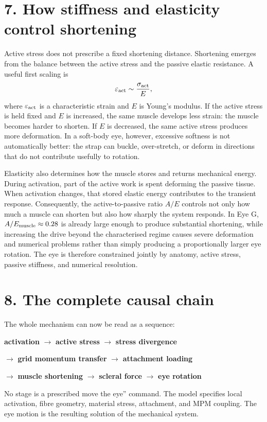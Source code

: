 \documentclass[11pt]{article}
\begin{document}
\section*{7. How stiffness and elasticity control shortening}
Active stress does not prescribe a fixed shortening distance. Shortening emerges from the balance between the active stress and the passive elastic resistance. A useful first scaling is
\begin{equation}
\varepsilon_{\rm act}\sim\frac{\sigma_{\rm act}}{E},
\label{eq:auto21}
\end{equation}
where $\varepsilon_{\rm act}$ is a characteristic strain and $E$ is Young's modulus. If the active stress is held fixed and $E$ is increased, the same muscle develops less strain: the muscle becomes harder to shorten. If $E$ is decreased, the same active stress produces more deformation. In a soft-body eye, however, excessive softness is not automatically better: the strap can buckle, over-stretch, or deform in directions that do not contribute usefully to rotation.

Elasticity also determines how the muscle stores and returns mechanical energy. During activation, part of the active work is spent deforming the passive tissue. When activation changes, that stored elastic energy contributes to the transient response. Consequently, the active-to-passive ratio $A/E$ controls not only how much a muscle can shorten but also how sharply the system responds. In Eye G, $A/E_{\rm muscle}\approx0.28$ is already large enough to produce substantial shortening, while increasing the drive beyond the characterised regime causes severe deformation and numerical problems rather than simply producing a proportionally larger eye rotation. The eye is therefore constrained jointly by anatomy, active stress, passive stiffness, and numerical resolution.

\section*{8. The complete causal chain}
The whole mechanism can now be read as a sequence:
\begin{tcolorbox}[colback=soft,colframe=accent]
\centering
\textbf{activation} $\rightarrow$ \textbf{active stress} $\rightarrow$ \textbf{stress divergence}\par
$\rightarrow$ \textbf{grid momentum transfer} $\rightarrow$ \textbf{attachment loading}\par
$\rightarrow$ \textbf{muscle shortening} $\rightarrow$ \textbf{scleral force} $\rightarrow$ \textbf{eye rotation}
\end{tcolorbox}
No stage is a prescribed move the eye'' command. The model specifies local activation, fibre geometry, material stress, attachment, and MPM coupling. The eye motion is the resulting solution of the mechanical system.
\end{document}
